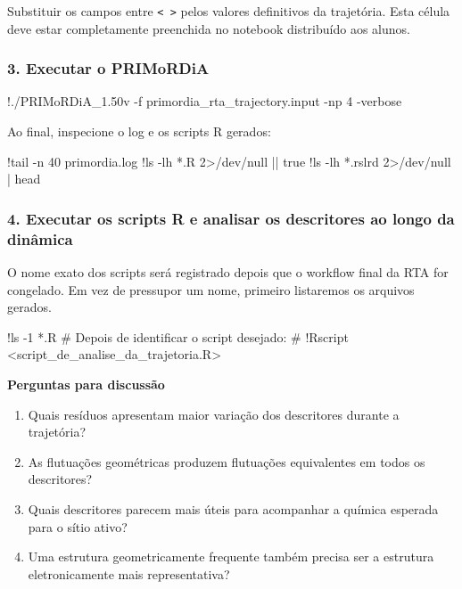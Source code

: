 \documentclass[a4paper,11pt]{refart}
\newcommand{\code}[1]{\texttt{#1}}
\begin{document}
\begin{todobox}
Substituir os campos entre \code{< >} pelos valores definitivos da trajetória. Esta célula deve estar completamente preenchida no notebook distribuído aos alunos.
\end{todobox}

\subsubsection{3. Executar o PRIMoRDiA}

\begin{shell}
!./PRIMoRDiA_1.50v -f primordia_rta_trajectory.input -np 4 -verbose
\end{shell}

Ao final, inspecione o log e os scripts R gerados:

\begin{shell}
!tail -n 40 primordia.log
!ls -lh *.R 2>/dev/null || true
!ls -lh *.rslrd 2>/dev/null | head
\end{shell}

\subsubsection{4. Executar os scripts R e analisar os descritores ao longo da dinâmica}

O nome exato dos scripts será registrado depois que o workflow final da RTA for congelado. Em vez de pressupor um nome, primeiro listaremos os arquivos gerados.

\begin{shell}
!ls -1 *.R
# Depois de identificar o script desejado:
# !Rscript <script_de_analise_da_trajetoria.R>
\end{shell}

\begin{interpretacaobox}
\textbf{Perguntas para discussão}
\begin{enumerate}
    \item Quais resíduos apresentam maior variação dos descritores durante a trajetória?
    \item As flutuações geométricas produzem flutuações equivalentes em todos os descritores?
    \item Quais descritores parecem mais úteis para acompanhar a química esperada para o sítio ativo?
    \item Uma estrutura geometricamente frequente também precisa ser a estrutura eletronicamente mais representativa?
\end{enumerate}
\end{interpretacaobox}
\end{document}
